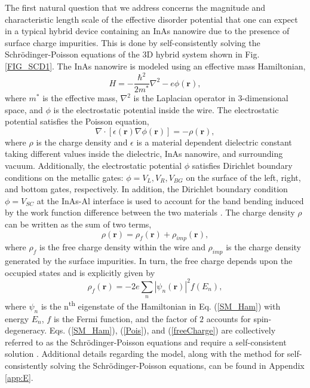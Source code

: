 \documentclass[aps,prmaterials,twocolumn,superscriptaddress,longbibliography]{revtex4-2}
\begin{document}
The first natural question that we address concerns the magnitude and characteristic length scale of the effective disorder potential that one can expect in a typical hybrid device containing an InAs nanowire due to the presence of surface charge impurities. This is done by self-consistently solving the Schr{\"o}dinger-Poisson equations of the 3D hybrid system shown in Fig. \ref{FIG_SCD1}. 
The InAs nanowire is modeled using an effective mass Hamiltonian,
\begin{equation}
	H = 
	-\frac{\hbar^2}{2 m^*} 
	\nabla^2 
	- e \phi\left(\mathbf{r}\right), \label{SM_Ham}
\end{equation}
where $m^*$ is the effective mass, $\nabla^2$ is the Laplacian operator in 3-dimensional space, and $\phi$ is the electrostatic potential inside the wire. The electrostatic potential satisfies the Poisson equation,
\begin{equation}
   	 \nabla \cdot \left[\epsilon(\mathbf{r}) \nabla\phi(\mathbf{r})\right] =
    	  -\rho(\mathbf{r}), \label{Pois}
\end{equation}
where $\rho$ is the charge density and $\epsilon$ is a material dependent dielectric constant taking different values inside the dielectric, InAs nanowire, and surrounding vacuum. Additionally, the electrostatic potential $\phi$ satisfies Dirichlet boundary conditions on the metallic gates: $\phi = V_L, V_R, V_{BG}$ on the surface of the left, right, and bottom gates, respectively. In addition, the Dirichlet boundary condition $\phi = V_{SC}$ at the InAs-Al interface is used to account for the band bending induced by the work function difference between the two materials \cite{vuik2016effects,antipov2018effects,mikkelsen2018hybridization,woods2018effective}. The charge density $\rho$ can be written as the sum of two terms,
\begin{equation}
    \rho(\mathbf{r}) = \rho_f(\mathbf{r}) + \rho_{imp}(\mathbf{r}), \label{Poisson}
\end{equation}
where $\rho_f$ is the free charge density within the wire and $\rho_{imp}$ is the charge density generated by the surface  impurities. In turn, the free charge depends upon the occupied states and is explicitly given by
\begin{equation}
    \rho_f(\mathbf{r}) = -2 e \sum_{n} \left|
    \psi_n(\mathbf{r})
    \right|^2 f\left(E_n\right), \label{freeCharge}
\end{equation}
where $\psi_n$ is the n\textsuperscript{th} eigenstate of the Hamiltonian in Eq. (\ref{SM_Ham}) with energy $E_n$, $f$ is the Fermi function, and the factor of $2$ accounts for spin-degeneracy. Eqs. (\ref{SM_Ham}), (\ref{Pois}), and (\ref{freeCharge}) are collectively referred to as the Schr{\"o}dinger-Poisson equations and require a self-consistent solution \cite{vuik2016effects,woods2018effective}. Additional details regarding the model, along with the method for self-consistently solving the Schr{\"o}dinger-Poisson equations, can be found in Appendix \ref{app:E}. 
\end{document}
